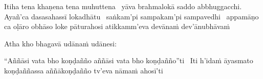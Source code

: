 \begin{pali-hang}
  Itiha tena khaṇena tena muhuttena \breathmark\ yāva brahmalokā saddo abbhuggacchi. Ayañ'ca dasasahassī lokadhātu \breathmark\ saṅkam'pi sampakam'pi sampavedhi \breathmark\ appamāṇo ca oḷāro obhāso loke pāturahosi atikkamm'eva devānaṁ dev'ānubhāvaṁ
\end{pali-hang}

Atha kho bhagavā udānaṁ udānesi:

\begin{pali-hang}
  ``Aññāsi vata bho koṇḍañño aññāsi vata bho koṇḍañño''ti \breathmark\ Iti h'idaṁ āyasmato koṇḍaññassa aññākoṇḍañño tv'eva nāmaṁ ahosī'ti
\end{pali-hang}

\suttaRef{[SN 56.11]}
